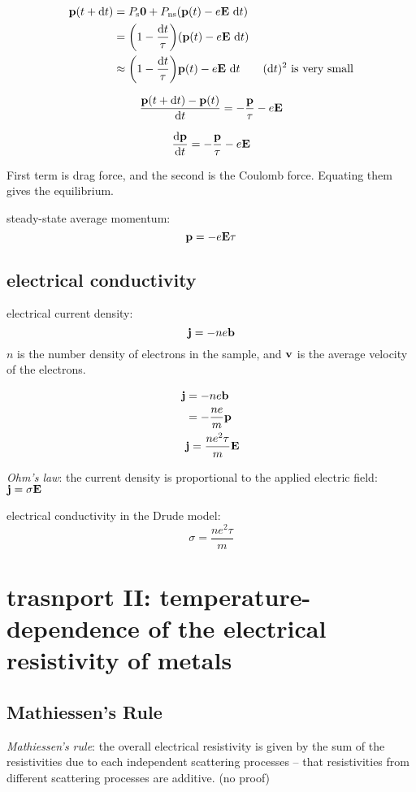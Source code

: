 \documentclass[10pt, a4paper, twocolumn]{article}
\newcommand{\deff}[1]{\par \noindent \textit{#1}: }
\begin{document}
\begin{equation*}
\begin{aligned}
\vb p(t+\dd t) &= P_\mathrm{s}\vb 0 +P_\mathrm{ns}
(\vb p(t)-e\vb E\ \dd t)
\\&=\pqty{1-\frac{\dd t}{\tau}}
(\vb p(t)-e\vb E\ \dd t)
\\&\approx \pqty{1-\frac{\dd t}{\tau}}
\vb p(t)-e\vb E\ \dd t
\qquad (\dd t)^2\text{ is very small}
\end{aligned}
\end{equation*}

\[\frac{\vb p(t+\dd t)-\vb p(t)}{\dd t}
=-\frac{\vb p}{\tau}-e\vb E\]

\[\dv{\vb p}{t} =-\frac{\vb p}{\tau}-e\vb E\]

First term is drag force, and the second is the Coulomb force. Equating them gives the equilibrium.

steady-state average momentum:
\[\vb p = -e \vb E \tau\]

\subsection{electrical conductivity}

electrical current density:
\[\vb j = -ne\vb b\]
$n$ is the number density of electrons in the sample, and $\vb v$ is the average velocity of the electrons.

\begin{equation*}
\begin{aligned}
\vb j &= -ne\vb b
\\&=-\frac{ne}{m}\vb p
\\&\vb j = \frac{ne^2\tau}{m}\vb E
\end{aligned}
\end{equation*}

\deff{Ohm's law}
the current density is proportional to the applied electric field: $\vb j = \sigma\vb E$

electrical conductivity in the Drude model:
\[\sigma = \frac{ne^2\tau}{m}\]

\section{trasnport II: temperature-dependence of the electrical resistivity of metals}

\subsection{Mathiessen's Rule}
\deff{Mathiessen's rule}
the overall electrical resistivity is given by the sum of the resistivities due to each independent scattering processes -- that resistivities from different scattering processes are additive. (no proof)
\end{document}
